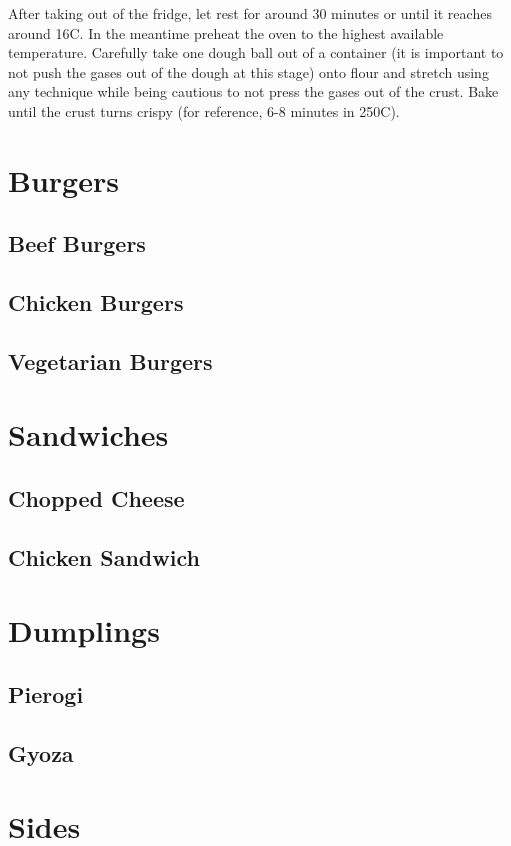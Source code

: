 \documentclass[11pt]{book}
\begin{document}
After taking out of the fridge, let rest for around 30 minutes or until it
reaches around 16C. In the meantime preheat the oven to the highest available
temperature. Carefully take one dough ball out of a container (it is important
to not push the gases out of the dough at this stage) onto flour and stretch
using any technique while being cautious to not press the gases out of the
crust. Bake until the crust turns crispy (for reference, 6-8 minutes in 250C).

\chapter{Burgers}
\section{Beef Burgers}
\section{Chicken Burgers}
\section{Vegetarian Burgers}

\chapter{Sandwiches}
\section{Chopped Cheese}
\section{Chicken Sandwich}

\chapter{Dumplings}
\section{Pierogi}
\section{Gyoza}

\chapter{Sides}
\end{document}
